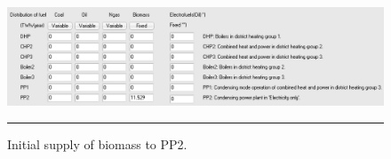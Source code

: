 \begin{figure}[htbp]
	\centering
	\includegraphics[width=\textwidth]{figures/B01_BM.png}
	\rule{\textwidth}{0.5pt} %
	\caption{Initial supply of biomass to PP2.}
	\label{fig:B01-BM}
\end{figure}